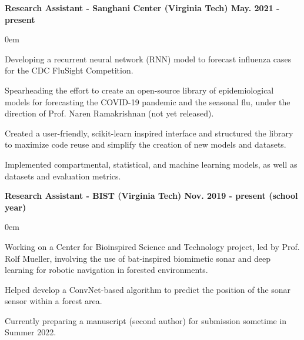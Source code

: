 \documentclass{article}
\begin{document}
\begin{center}
\begin{flushleft}
    \textbf{Research Assistant - Sanghani Center (Virginia Tech) \hfill May. 2021 - present}
    \begin{compactitem}
      \itemsep0em
      \item Developing a recurrent neural network (RNN) model to forecast influenza cases for the CDC FluSight Competition.
      \item Spearheading the effort to create an open-source library of epidemiological models for forecasting the COVID-19 pandemic and the seasonal flu, under the direction of Prof. Naren Ramakrishnan (not yet released).
      \item Created a user-friendly, scikit-learn inspired interface and structured the library to maximize code reuse and simplify the creation of new models and datasets.
      \item Implemented compartmental, statistical, and machine learning models, as well as datasets and evaluation metrics.
    \end{compactitem}

    \textbf{Research Assistant - BIST (Virginia Tech) \hfill Nov. 2019 - present (school year)}
    \begin{compactitem}
      \itemsep0em
      \item Working on a Center for Bioinspired Science and Technology project, led by Prof. Rolf Mueller, involving the use of bat-inspired biomimetic sonar and deep learning for robotic navigation in forested environments.
      \item Helped develop a ConvNet-based algorithm to predict the position of the sonar sensor within a forest area.
      \item Currently preparing a manuscript (second author) for submission sometime in Summer 2022.
    \end{compactitem}


\end{flushleft}
\end{center}
\end{document}
